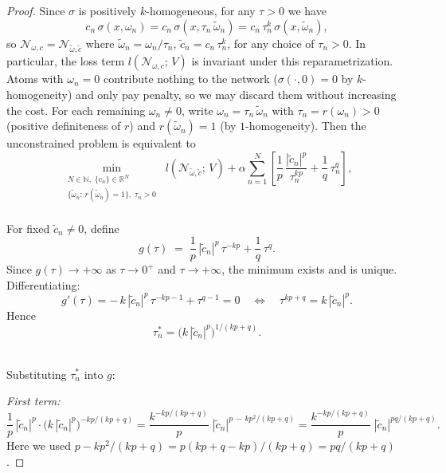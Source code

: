 \documentclass[11pt]{amsart}
\theoremstyle{definition}
\theoremstyle{remark}
\begin{document}
\begin{proof}
	Since $\sigma$ is positively $k$-homogeneous, for any $\tau > 0$ we have
	\begin{equation*}
		c_n\,\sigma(x, \omega_n)
		= c_n\,\sigma(x, \tau_n\,\tilde\omega_n)
		= c_n\,\tau_n^k\,\sigma(x, \tilde\omega_n),
	\end{equation*}
	so $\mathcal{N}_{\omega,c} = \mathcal{N}_{\tilde\omega,\tilde c}$ where $\tilde\omega_n = \omega_n / \tau_n$, $\tilde c_n = c_n\,\tau_n^k$, for any choice of $\tau_n > 0$. In particular, the loss term $l(\mathcal{N}_{\omega,c};\,V)$ is
	invariant under this reparametrization.
	Atoms with $\omega_n = 0$ contribute nothing to the network ($\sigma(\cdot, 0) = 0$ by $k$-homogeneity) and only pay penalty, so we may discard them without increasing the cost.
	For each remaining $\omega_n \neq 0$, write $\omega_n = \tau_n\,\tilde\omega_n$ with $\tau_n = r(\omega_n) > 0$ (positive definiteness of $r$) and $r(\tilde\omega_n) = 1$ (by $1$-homogeneity).
	Then the unconstrained problem is equivalent to
	\begin{equation*}
	\min_{\substack{N \in \mathbb{N},\; \{c_n\} \in \mathbb{R}^N \\
	\{\tilde\omega_n:\, r(\tilde\omega_n) = 1\},\; \tau_n > 0}}
	\; l(\mathcal{N}_{\tilde\omega,\tilde c};\, V)
	+ \alpha \sum_{n=1}^{N}
	\left[ \frac{1}{p}\,\frac{|\tilde c_n|^p}{\tau_n^{kp}} + \frac{1}{q}\,\tau_n^q \right],
\end{equation*}
\quad\\
For fixed $\tilde c_n \neq 0$, define
\begin{equation*}
	g(\tau) \;=\; \frac{1}{p}\,|\tilde c_n|^p\,\tau^{-kp} + \frac{1}{q}\,\tau^q.
\end{equation*}
Since $g(\tau) \to +\infty$ as $\tau \to 0^+$ and $\tau \to +\infty$, the minimum exists and is unique. Differentiating:
\begin{equation*}
	g'(\tau) = -\,k\,|\tilde c_n|^p\,\tau^{-kp-1} + \tau^{q-1} = 0
	\quad\Longleftrightarrow\quad
	\tau^{kp+q} = k\,|\tilde c_n|^p.
\end{equation*}
Hence
\begin{equation*}
	\tau_n^* = \bigl(k\,|\tilde c_n|^p\bigr)^{1/(kp+q)}.
\end{equation*}

\quad\\
Substituting $\tau_n^*$ into $g$:

\emph{First term:}
\begin{equation*}
	\frac{1}{p}\,|\tilde c_n|^p \cdot \bigl(k\,|\tilde c_n|^p\bigr)^{-kp/(kp+q)}
	= \frac{k^{-kp/(kp+q)}}{p}\;|\tilde c_n|^{p\,-\,kp^2/(kp+q)}
	= \frac{k^{-kp/(kp+q)}}{p}\;|\tilde c_n|^{pq/(kp+q)}.
\end{equation*}
Here we used $p - kp^2/(kp+q) = p(kp+q-kp)/(kp+q) = pq/(kp+q)$.


\end{proof}
\end{document}
